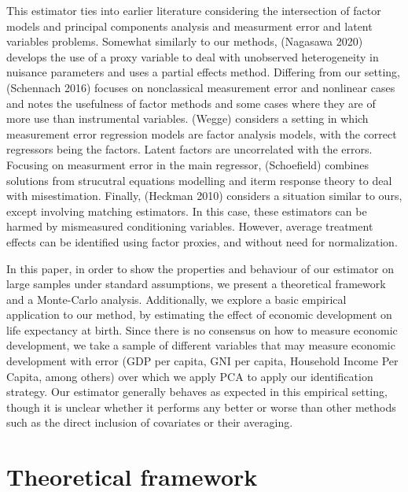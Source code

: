 \documentclass[12pt]{article}
\begin{document}
        This estimator ties into earlier literature considering the intersection of factor models and principal components analysis and measurment error and latent variables problems. Somewhat similarly to our methods, (Nagasawa 2020) develops the use of a proxy variable to deal with unobserved heterogeneity in nuisance parameters and uses a partial effects method. Differing from our setting, (Schennach 2016) focuses on nonclassical measurement error and nonlinear cases and notes the usefulness of factor methods and some cases where they are of more use than instrumental variables. (Wegge) considers a setting in which measurement error regression models are factor analysis models, with the correct regressors being the factors. Latent factors are uncorrelated with the errors. Focusing on measurment error in the main regressor, (Schoefield) combines solutions from strucutral equations modelling and iterm response theory to deal with misestimation. Finally, (Heckman 2010) considers a situation similar to ours, except involving matching estimators. In this case, these estimators can be harmed by mismeasured conditioning variables. However, average treatment effects can be identified using factor proxies, and without need for normalization.

        In this paper, in order to show the properties and behaviour of our estimator on large samples under standard assumptions, we present a theoretical framework and a Monte-Carlo analysis. Additionally, we explore a basic empirical application to our method, by estimating the effect of economic development on life expectancy at birth. Since there is no consensus on how to measure economic development, we take a sample of different variables that may measure economic development with error (GDP per capita, GNI per capita, Household Income Per Capita, among others) over which we apply PCA to apply our identification strategy. Our estimator generally behaves as expected in this empirical setting, though it is unclear whether it performs any better or worse than other methods such as the direct inclusion of covariates or their averaging.

\section*{Theoretical framework}
\end{document}
